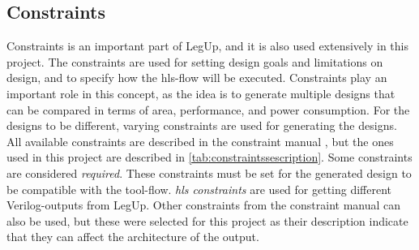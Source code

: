 \subsection{\label{subsec:legupconstraintstheory}Constraints}
Constraints is an important part of LegUp, and it is also used extensively in this project. The constraints are used for setting design goals and limitations on design, and to specify how the \gls{hls}-flow will be executed. Constraints play an important role in this concept, as the idea is to generate multiple designs that can be compared in terms of area, performance, and power consumption. For the designs to be different, varying constraints are used for generating the designs. All available constraints are described in the constraint manual \cite{legupconst}, but the ones used in this project are described in \cref{tab:constraintssescription}. Some constraints are considered \textit{required}. These constraints must be set for the generated design to be compatible with the tool-flow. \textit{\gls{hls} constraints} are used for getting different Verilog-outputs from LegUp. Other constraints from the constraint manual can also be used, but these were selected for this project as their description indicate that they can affect the architecture of the output.
